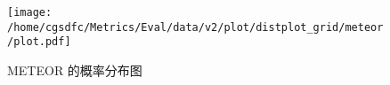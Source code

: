 \begin{figure}[H]%
\centering%
\texttt{[image: /home/cgsdfc/Metrics/Eval/data/v2/plot/distplot\_grid/meteor/plot.pdf]}%
\caption{METEOR 的概率分布图}%
\label{fig:METEORdist}%
\end{figure}